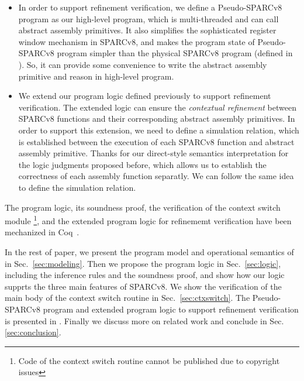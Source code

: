 \begin{itemize}
    \item
    In order to support refinement verification, we define a
    Pseudo-SPARCv8 program as our high-level program, which
    is multi-threaded and can call abstract
    assembly primitives. It also simplifies
    the sophisticated register window mechanism in SPARCv8,
    and makes the program state of Pseudo-SPARCv8 program
    simpler than the physical SPARCv8 program
    (defined in \Sec{\ref{sec:modeling}}).
    So, it can provide some convenience
    to write the abstract assembly primitive
    and reason in high-level program.

    \item
    We extend our program logic defined
    previously to support refinement verification.
    The extended logic can ensure
    the {\it contextual refinement} between
    SPARCv8 functions and their corresponding
    abstract assembly primitives. In order to support
    this extension, we need to define a simulation
    relation, which is established
    between the execution of each SPARCv8 function
    and abstract assembly primitive.
    Thanks for our direct-style semantics interpretation
    for the logic judgments proposed before,
    which allows us to establish the correctness of
    each assembly function separatly.
    We can follow the same idea to define the
    simulation relation.

\end{itemize}
The program logic, its soundness proof,
the verification of the context switch module
\footnote{Code of the context switch routine cannot
be published due to copyright issues},
and the extended program logic for
refinememt verification have been mechanized in
Coq~\cite{coqimp}.


In the rest of paper,
we present the program model
and operational semantics of \sparc{} in Sec.~\ref{sec:modeling}.
Then we propose the program logic in Sec.~\ref{sec:logic},
including the inference rules and the soundness proof,
and show how our logic supprts the three main features of SPARCv8.
We show the verification of the main body of the context switch routine
in Sec.~\ref{sec:ctxswitch}.
The Pseudo-SPARCv8 program and extended
program logic to support refinement verification is
presented in \Sec{\ref{sec:refine-verification-sparc}}.
Finally we discuss more on
related work and conclude in Sec. \ref{sec:conclusion}.
